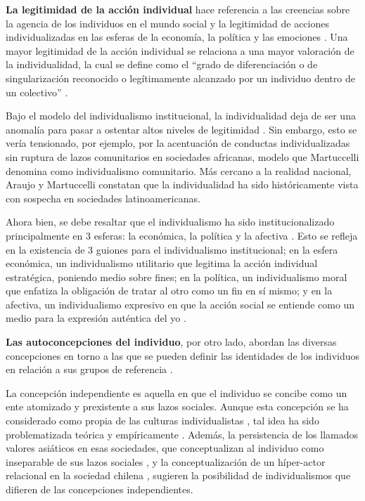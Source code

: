 \documentclass[12pt,oneside]{templates/facsothesis}
\begin{document}
\textbf{La legitimidad de la acción individual} hace referencia a las creencias sobre la agencia de los individuos en el mundo social \citep{brewer2007} y la legitimidad de acciones individualizadas en las esferas de la economía, la política y las emociones \citep{cortois2018}. Una mayor legitimidad de la acción individual se relaciona a una mayor valoración de la individualidad, la cual se define como el ``grado de diferenciación o de singularización reconocido o legítimamente alcanzado por un individuo dentro de un colectivo'' \citep[p.~10]{martuccelli2018}.

Bajo el modelo del individualismo institucional, la individualidad deja de ser una anomalía para pasar a ostentar altos niveles de legitimidad \citep{martuccelli2018}. Sin embargo, esto se vería tensionado, por ejemplo, por la acentuación de conductas individualizadas sin ruptura de lazos comunitarios en sociedades africanas, modelo que Martuccelli \citeyearpar{martuccelli2018} denomina como individualismo comunitario. Más cercano a la realidad nacional, Araujo y Martuccelli \citeyearpar{araujo2020a} constatan que la individualidad ha sido históricamente vista con sospecha en sociedades latinoamericanas.

Ahora bien, se debe resaltar que el individualismo ha sido institucionalizado principalmente en 3 esferas: la económica, la política y la afectiva \citep{cortois2018, martuccelli2018}. Esto se refleja en la existencia de 3 guiones para el individualismo institucional; en la esfera económica, un individualismo utilitario que legitima la acción individual estratégica, poniendo medio sobre fines; en la política, un individualismo moral que enfatiza la obligación de tratar al otro como un fin en sí mismo; y en la afectiva, un individualismo expresivo en que la acción social se entiende como un medio para la expresión auténtica del yo \citep{cortois2018}.

\textbf{Las autoconcepciones del individuo}, por otro lado, abordan las diversas concepciones en torno a las que se pueden definir las identidades de los individuos en relación a sus grupos de referencia \citep{brewer2007}.

La concepción independiente es aquella en que el individuo se concibe como un ente atomizado y prexistente a sus lazos sociales. Aunque esta concepción se ha considerado como propia de las culturas individualistas \citep{benavides2020, cross2011}, tal idea ha sido problematizada teórica \citep{voronov2002} y empíricamente \citep{benavides2020, kolstad2009}. Además, la persistencia de los llamados valores asiáticos en esas sociedades, que conceptualizan al individuo como inseparable de sus lazos sociales \citep{zhai2022}, y la conceptualización de un híper-actor relacional en la sociedad chilena \citep{araujo2020}, sugieren la posibilidad de individualismos que difieren de las concepciones independientes.
\end{document}
